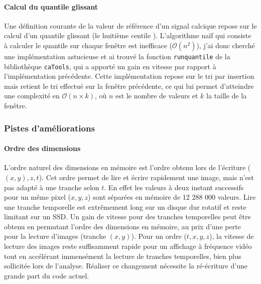 \paragraph{Calcul du quantile glissant}
Une définition courante de la valeur de référence d'un signal calcique repose sur le calcul d'un quantile glissant (le huitième centile  \cite{dombeck_imaging_2007}). L'algorithme naïf qui consiste à calculer le quantile sur chaque fenêtre est inefficace ($\mathcal{O}(n^2)$), j'ai donc cherché une implémentation astucieuse et ai trouvé la fonction \verb|runquantile| de la bibliothèque \verb|caTools|, qui a apporté un gain en vitesse par rapport à l'implémentation précédente. Cette implémentation repose sur le tri par insertion mais retient le tri effectué sur la fenêtre précédente, ce qui lui permet d'atteindre une complexité en $\mathcal{O}(n\times k)$, où $n$ est le nombre de valeurs et $k$ la taille de la fenêtre.



\subsubsection{Pistes d'améliorations}

\paragraph{Ordre des dimensions}
L'ordre naturel des dimensions en mémoire est l'ordre obtenu lors de l'écriture ($(x,y),z,t$). Cet ordre permet de lire et écrire rapidement une image, mais n'est pas adapté à une tranche selon $t$. En effet les valeurs à deux instant successifs pour un même pixel ($x,y,z$) sont séparées en mémoire de 12 288 000 valeurs. Lire une tranche temporelle est extrêmement long sur un disque dur rotatif et reste limitant sur un SSD. Un gain de vitesse pour des tranches temporelles peut être obtenu en permutant l'ordre des dimensions en mémoire, au prix d'une perte pour la lecture d'images (tranche $(x,y)$). Pour un ordre ($t,x,y,z$), la vitesse de lecture des images reste suffisamment rapide pour un affichage à fréquence vidéo tout en accélérant immensément la lecture de tranches temporelles, bien plus sollicitée lors de l'analyse. Réaliser ce changement nécessite la ré-écriture d'une grande part du code actuel.

